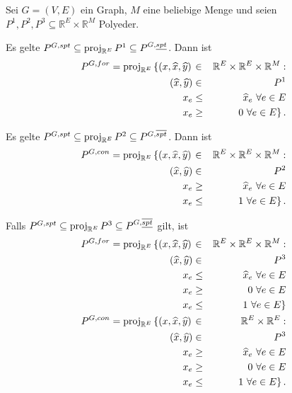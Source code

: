 \documentclass[10p,a4paper,BCOR = 12mm, DIV=15]{scrbook}
\begin{document}
\begin{Kor}
\label{kor:erw_form_wald_konnektor}
Sei $G=\left(V, E\right)$ ein Graph, $M$ eine beliebige Menge und seien $P^1, P^2, P^3 \subseteq \mathbb{R}^{E} \times \mathbb{R}^M$ Polyeder.

Es gelte $P^{G, spt} \subseteq \operatorname{proj}_{\mathbb{R}^{E}} P^1 \subseteq P^{G, \underline{spt}}$. Dann ist
\begin{eqnarray*}
P^{G, for} = \operatorname{proj}_{\mathbb{R}^{E}} \left\{\left(x, \widehat{x}, \widehat{y}\right) \right. & \in & \mathbb{R}^E \times \mathbb{R}^E \times \mathbb{R}^M: \nonumber \\
\left(\widehat{x}, \widehat{y}\right) & \in & P^1 \\
x_e & \leq & \widehat{x}_e\ \forall e \in E \\
x_e & \geq & \left.0\ \forall e \in E\right\}.
\end{eqnarray*}

Es gelte $P^{G, spt} \subseteq \operatorname{proj}_{\mathbb{R}^{E}} P^2 \subseteq P^{G, \overline{spt}}$. Dann ist
\begin{eqnarray*}
P^{G, con} = \operatorname{proj}_{\mathbb{R}^{E}} \left\{\left(x, \widehat{x}, \widehat{y}\right) \right. & \in & \mathbb{R}^E \times \mathbb{R}^E \times \mathbb{R}^M: \nonumber \\
\left(\widehat{x}, \widehat{y}\right) & \in & P^2 \\
x_e & \geq & \widehat{x}_e\ \forall e \in E \\
x_e & \leq & \left.1\ \forall e \in E\right\}.
\end{eqnarray*}

Falls $P^{G, spt} \subseteq \operatorname{proj}_{\mathbb{R}^{E}} P^3 \subseteq P^{G, \overline{\underline{spt}}}$ gilt, ist
\begin{eqnarray*}
P^{G, for} = \operatorname{proj}_{\mathbb{R}^{E}} \left\{\left(x, \widehat{x}, \widehat{y}\right) \right. & \in & \mathbb{R}^E \times \mathbb{R}^E \times \mathbb{R}^M: \nonumber \\
\left(\widehat{x}, \widehat{y}\right) & \in & P^3 \\
x_e & \leq & \widehat{x}_e\ \forall e \in E \\
x_e & \geq & 0\ \forall e \in E \\
x_e & \leq & \left.1\ \forall e \in E\right\} \\
P^{G, con} = \operatorname{proj}_{\mathbb{R}^{E}} \left\{\left(x, \widehat{x}, \widehat{y}\right) \right. & \in & \mathbb{R}^E \times \mathbb{R}^E: \nonumber \\
\left(\widehat{x}, \widehat{y}\right) & \in & P^3 \\
x_e & \geq & \widehat{x}_e\ \forall e \in E \\
x_e & \geq & 0\ \forall e \in E \\
x_e & \leq & \left.1\ \forall e \in E\right\}.
\end{eqnarray*}
\end{Kor}
\end{document}
